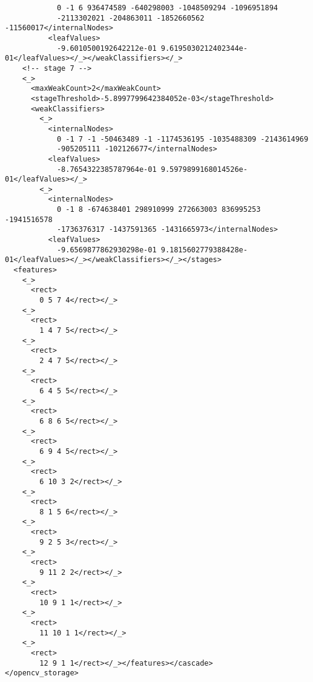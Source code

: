 \begin{lstlisting}
            0 -1 6 936474589 -640298003 -1048509294 -1096951894
            -2113302021 -204863011 -1852660562 -11560017</internalNodes>
          <leafValues>
            -9.6010500192642212e-01 9.6195030212402344e-01</leafValues></_></weakClassifiers></_>
    <!-- stage 7 -->
    <_>
      <maxWeakCount>2</maxWeakCount>
      <stageThreshold>-5.8997799642384052e-03</stageThreshold>
      <weakClassifiers>
        <_>
          <internalNodes>
            0 -1 7 -1 -50463489 -1 -1174536195 -1035488309 -2143614969
            -905205111 -102126677</internalNodes>
          <leafValues>
            -8.7654322385787964e-01 9.5979899168014526e-01</leafValues></_>
        <_>
          <internalNodes>
            0 -1 8 -674638401 298910999 272663003 836995253 -1941516578
            -1736376317 -1437591365 -1431665973</internalNodes>
          <leafValues>
            -9.6569877862930298e-01 9.1815602779388428e-01</leafValues></_></weakClassifiers></_></stages>
  <features>
    <_>
      <rect>
        0 5 7 4</rect></_>
    <_>
      <rect>
        1 4 7 5</rect></_>
    <_>
      <rect>
        2 4 7 5</rect></_>
    <_>
      <rect>
        6 4 5 5</rect></_>
    <_>
      <rect>
        6 8 6 5</rect></_>
    <_>
      <rect>
        6 9 4 5</rect></_>
    <_>
      <rect>
        6 10 3 2</rect></_>
    <_>
      <rect>
        8 1 5 6</rect></_>
    <_>
      <rect>
        9 2 5 3</rect></_>
    <_>
      <rect>
        9 11 2 2</rect></_>
    <_>
      <rect>
        10 9 1 1</rect></_>
    <_>
      <rect>
        11 10 1 1</rect></_>
    <_>
      <rect>
        12 9 1 1</rect></_></features></cascade>
</opencv_storage>
\end{lstlisting}
